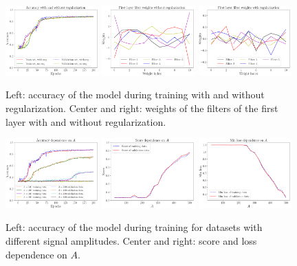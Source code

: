 \documentclass[prl,twocolumn]{revtex4-1}
\begin{document}
\begin{figure}[!t]
    \centering 
    \includegraphics[width=0.32\textwidth]{Images/Results/Acc_reg.pdf}
    \hskip 1mm
    \includegraphics[width=0.32\textwidth]{Images/Results/Weights_noReg.pdf}
    \hskip 1mm
    \includegraphics[width=0.32\textwidth]{Images/Results/Weights_reg.pdf}

    \caption{Left: accuracy of the model during training with and without regularization. Center and right: weights of the filters of the first layer with and without regularization.}
    \label{fig:weights}
\end{figure}
\begin{figure}[!t]
    \centering 
    \includegraphics[width=0.32\textwidth]{Images/Results/A_acc_SNR.pdf}
    \hskip 1mm
    \includegraphics[width=0.32\textwidth]{Images/Results/SNR_A_acc_over_A.pdf}
    \hskip 1mm
    \includegraphics[width=0.32\textwidth]{Images/Results/SNR_A_loss_over_A.pdf}

    \caption{Left: accuracy of the model during training for datasets with different signal amplitudes. Center and right: score and loss dependence on $A$.}
    \label{fig:ratio}
\end{figure}
\end{document}

